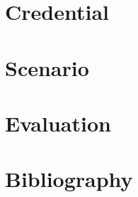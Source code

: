 \documentclass{article}
\begin{document}
\section{Credential}
\label{sec:credential}

\lipsum[3]

\section{Scenario}

\lipsum[4]

\section{Evaluation}

\lipsum[5]

\section{Bibliography}

\lipsum[6]








\end{document}
